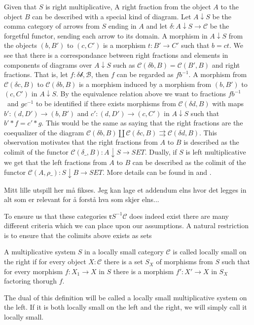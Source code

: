     \begin{remark}
        Given that $S$ is right multiplicative, A right fraction from the object $A$ to the object $B$ can be described with a special kind of diagram. Let $A\downarrow S$ be the comma category of arrows from $S$ ending in $A$ and let $\delta : A\downarrow S\rightarrow\mathcal{C}$ be the forgetful functor, sending each arrow to its domain. A morphism in $A\downarrow S$ from the objects $(b,B')$ to $(c,C')$ is a morphism $t : B'\rightarrow C'$ such that $b=ct$. We see that there is a correspondance between right fractions and elements in components of diagrams over $A\downarrow S$ such as $\mathcal{C}(\delta b, B)=\mathcal{C}(B',B)$ and right fractions. That is, let $f:\mathcal{\delta b, B}$, then $f$ can be regarded as $fb^{-1}$. A morphism from $\mathcal{C}(\delta c, B)$ to $\mathcal{C}(\delta b, B)$ is a morphism induced by a morphism from $(b,B')$ to $(c,C')$ in $A\downarrow S$. By the equivalence relation above we want to fractions $fb^{-1}$ and $gc^{-1}$ to be identified if there exists morphisms from $\mathcal{C}(\delta d, B)$ with maps $b' : (d,D')\rightarrow (b,B')$ and $c' : (d,D')\rightarrow (c,C')$ in $A\downarrow S$ such that $b'*f = c'*g$. This would be the same as saying that the right fractions are the coequalizer of the diagram $\mathcal{C}(\delta b, B)\coprod \mathcal{C}(\delta c, B)\rightrightarrows \mathcal{C}(\delta d, B)$. This observation motivates that the right fractions from $A$ to $B$ is described as the colimit of the functor $\mathcal{C}(\delta\_, B):A\downarrow S\rightarrow SET$. Dually, if $S$ is left multiplicative we get that the left fractions from $A$ to $B$ can be described as the colimit of the functor $\mathcal{C}(A, \rho\_):S\downarrow B\rightarrow SET$. More details can be found in \cite{zisman} and \cite{weibel}.
    \end{remark}

    Mitt lille utspill her må fikses. Jeg kan lage et addendum elns hvor det legges in alt som er relevant for å forstå hva som skjer elns...

    To ensure us that these categories $\mathfrak{r}S^{-1}\mathcal{C}$ does indeed exist there are many different criteria which we can place upon our assumptions. A natural restriction is to ensure that the colimits above exists as sets

    \begin{definition}
        A multiplicative system $S$ in a locally small category $\mathcal{C}$ is called locally small on the right if for every object $X:\mathcal{C}$ there is a set $S_X$ of morphisms from $S$ such that for every morphism $f : X_1 \rightarrow X$ in $S$ there is a morphism $f' : X'\rightarrow X$ in $S_X$ factoring thorugh $f$.

        The dual of this definition will be called a locally small multiplicative system on the left. If it is both locally small on the left and the right, we will simply call it locally small. 
    \end{definition}

